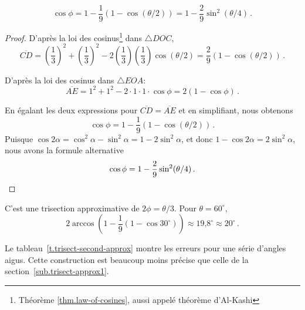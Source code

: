 \begin{theorem}
\[
\cos\phi=1 - \frac{1}{9}(1-\cos(\theta/2))=1 - \frac{2}{9}\sin^2(\theta/4)\,.
\]
\end{theorem}

\begin{proof} D'après la loi des cosinus\footnote{Théorème \ref{thm.law-of-cosines}, aussi appelé théorème d'Al-Kashi } dans $\triangle DOC$,
\[
\overline{CD}= \left(\frac{1}{3}\right)^2+\left(\frac{1}{3}\right)^2-2\left(\frac{1}{3}\right)\left(\frac{1}{3}\right)\cos (\theta/2)=\frac{2}{9}(1-\cos(\theta/2))\,.
\]

D'après la loi des cosinus dans  $\triangle EOA$:
\[
\overline{AE} = 1^2+1^2-2\cdot 1\cdot 1\cdot \cos \phi=2(1-\cos \phi)\,.
\]



En égalant les deux expressions pour $\overline{CD}=\overline{AE}$ et en simplifiant, nous obtenons 
\[
\cos \phi = 1 - \frac{1}{9}(1-\cos(\theta/2))\,.
\]
Puisque $\cos 2\alpha= \cos^2 \alpha-\sin^2\alpha=1-2\sin^2\alpha$, et donc $1-\cos 2\alpha=2\sin^2\alpha$, nous avons la formule alternative 
\[
\cos \phi = 1 - \frac{2}{9}\sin^2(\theta/4)\,.\qedhere
\]
\end{proof}

C'est une trisection approximative de $2\phi=\theta/3$. Pour $\theta=60^\circ$,
\[
2\arccos\left(1 - \frac{1}{9}(1-\cos 30^\circ)\right)\approx \mbox{19,8}^\circ\approx 20^\circ\,.
\]

Le tableau~\ref{t.trisect-second-approx} montre les erreurs pour une série d'angles aigus. Cette construction est beaucoup moins précise que celle de la section~\ref{sub.trisect-approx1}.

